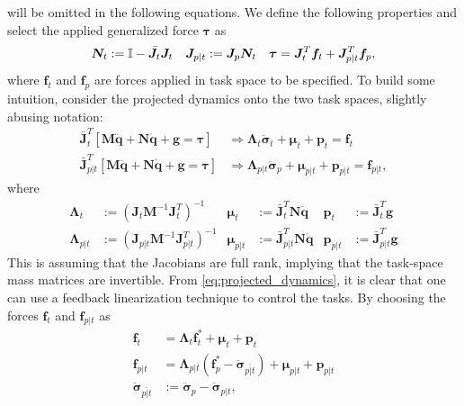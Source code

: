 will be omitted in the following equations. We define the following properties and
select the applied generalized force $\bm{\tau}$ as
\begin{align}
    \bm{N}_t &:= \mathbb{I} - \bar{\bm{J}}_t \bm{J}_t &
    \bm{J}_{p|t} &:= \bm{J}_p \bm{N}_t &
    \bm{\tau} = \bm{J}_t^T \bm{f}_t + \bm{J}_{p|t}^T \bm{f}_p,
    \label{eq:force_application}
\end{align}
where $\bm{f}_t$ and $\bm{f}_p$ are forces applied in task space to be
specified. To build some intuition, consider the projected dynamics onto
the two task spaces, slightly abusing notation:
\begin{subequations}
    \label{eq:projected_dynamics}
\begin{align}
    \bar{\bm{J}}_t^T \left[
        \bm{M} \ddot{\bm{q}} + \bm{N} \dot{\bm{q}} + \bm{g} = \bm{\tau}
        \right]
    &\Rightarrow
    \bm{\Lambda}_t \ddot{\bm{\sigma}}_t + \bm{\mu}_t + \bm{p}_t = \bm{f}_t \\
    \bar{\bm{J}}_{p|t}^T \left[
        \bm{M} \ddot{\bm{q}} + \bm{N} \dot{\bm{q}} + \bm{g} = \bm{\tau}
        \right]
    &\Rightarrow
    \bm{\Lambda}_{p|t} \ddot{\bm{\sigma}}_p + \bm{\mu}_{p|t} + \bm{p}_{p|t} = \bm{f}_{p|t},
\end{align}
\end{subequations}
where
\begin{subequations}
\begin{align}
    \bm{\Lambda}_t &:= \left(\bm{J}_t \bm{M}^{-1} \bm{J}_t^T\right)^{-1} &
    \bm{\mu}_t &:= \bar{\bm{J}}_t^T \bm{N} \dot{\bm{q}} &
    \bm{p}_t &:= \bar{\bm{J}}_t^T \bm{g} \\
    \bm{\Lambda}_{p|t} &:= \left(\bm{J}_{p|t} \bm{M}^{-1} \bm{J}_{p|t}^T\right)^{-1} \label{eq:lambda_pIt} &
    \bm{\mu}_{p|t} &:= \bar{\bm{J}}_{p|t}^T \bm{N} \dot{\bm{q}} &
    \bm{p}_{p|t} &:= \bar{\bm{J}}_{p|t}^T \bm{g}
\end{align}
\end{subequations}
This is assuming that the Jacobians are full rank, implying that the task-space
mass matrices are invertible. From \autoref{eq:projected_dynamics}, it is clear
that one can use a feedback linearization technique to control the tasks. By
choosing the forces $\bm{f}_t$ and $\bm{f}_{p|t}$ as
\begin{subequations}
\begin{align}
    \bm{f}_t &= \bm{\Lambda}_t \bm{f}_t^* + \bm{\mu}_t + \bm{p}_t \\
    \bm{f}_{p|t} &= \bm{\Lambda}_{p|t} \left(\bm{f}_p^* - \ddot{\bm{\sigma}}_{\overline{p|t}}\right) + \bm{\mu}_{p|t} + \bm{p}_{p|t} \label{eq:osc_fp|t}\\
    \ddot{\bm{\sigma}}_{\overline{p|t}} &:= \ddot{\bm{\sigma}}_p - \ddot{\bm{\sigma}}_{p|t},
\end{align}
\end{subequations}
